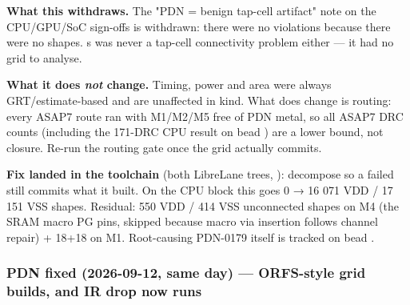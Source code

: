 \begin{record}
\textbf{What this withdraws.} The "PDN = benign tap-cell artifact" note
on the CPU/\allowbreak{}GPU/\allowbreak{}SoC sign-offs is withdrawn:
there were no violations because there were no shapes.
\textquotesingle s  was never a
tap-cell connectivity problem either --- it had no grid to analyse.

\textbf{What it does \emph{not} change.} Timing, power and area were
always GRT/\allowbreak{}estimate-based and are unaffected in kind. What
does change is routing: every ASAP7 route ran with M1/M2/M5 free of PDN
metal, so all ASAP7 DRC counts (including the 171-DRC CPU result on bead
) are a lower bound, not closure. Re-run the routing gate once
the grid actually commits.

\textbf{Fix landed in the toolchain} (both LibreLane trees,
): decompose  so a
failed  still commits what it built. On the CPU block
this goes 0 → 16 071 VDD / 17 151 VSS shapes. Residual: 550 VDD / 414
VSS unconnected shapes on M4 (the SRAM macro PG pins, skipped because
macro via insertion follows channel repair) + 18+18 on M1. Root-causing
PDN-0179 itself is tracked on bead .

\end{record}

\subsubsection{PDN fixed (2026-09-12, same day) --- ORFS-style grid
builds, and IR drop now runs}\label{cr:run:phase5:pdn-fixed-2026-09-12-same-day-orfs-style-grid-builds-and-ir-drop-now-runs}


